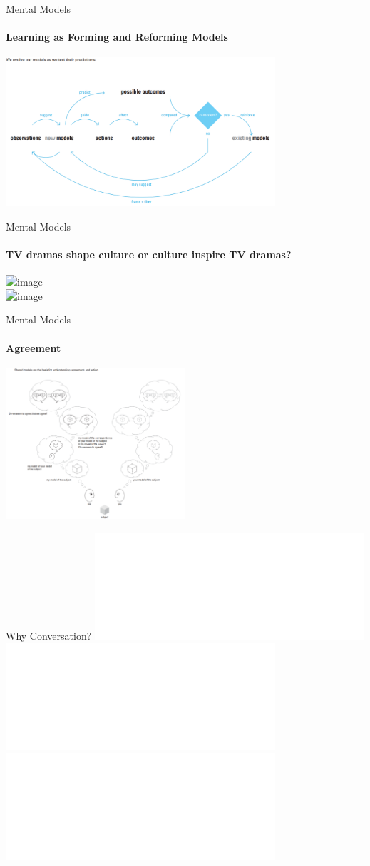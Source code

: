 \documentclass[
	11pt,
	aspectratio=169,
]{beamer}
\begin{document}
                \begin{frame}{Mental Models \cite{dubberly2009}}
                    \framesubtitle{Learning as Forming and Reforming Models}
                    \centering\includegraphics[width=0.75\textwidth]{resources/learning.PNG}
                \end{frame}
                \begin{frame}{Mental Models \cite{dubberly2009}}
                    \framesubtitle{TV dramas shape culture or culture inspire TV dramas?}
                    \centering\includegraphics<1->[width=0.75\textwidth]{resources/models4.PNG} \\
                    \centering\includegraphics<2->[width=0.25\textwidth]{resources/chickenegg.jpg}
                \end{frame}
                \begin{frame}{Mental Models \cite{dubberly2009}}
                    \framesubtitle{Agreement}
                    \centering\includegraphics[width=0.5\textwidth]{resources/models5.PNG}
                \end{frame}
                \begin{frame}{Why Conversation? \cite{pangaro_web}}
                    \centering\includegraphics<1>[page=35, width=0.75\textwidth]{resources/Pangaro-HCII_Seminar-April_2019-distro.pdf}
                    \centering\includegraphics<2>[page=36, width=0.75\textwidth]{resources/Pangaro-HCII_Seminar-April_2019-distro.pdf}
                    \centering\includegraphics<3>[page=37, width=0.75\textwidth]{resources/Pangaro-HCII_Seminar-April_2019-distro.pdf}
                \end{frame}
\end{document}
